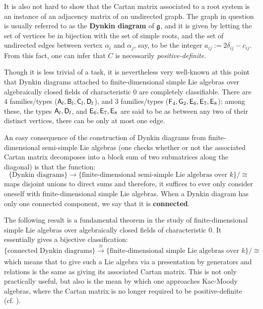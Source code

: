         \begin{remark}
            It is also not hard to show that the Cartan matrix associated to a root system is an instance of an adjacency matrix of an undirected graph. The graph in question is usually referred to as the \textbf{Dynkin diagram} of $\mathfrak{g}$, and it is given by letting the set of vertices be in bijection with the set of simple roots, and the set of undirected edges between vertex $\alpha_i$ and $\alpha_j$, say, to be the integer $a_{ij} := 2 \delta_{ij} - c_{ij}$. From this fact, one can infer that $C$ is necessarily \textit{positive-definite}.

            Though it is less trivial of a task, it is nevertheless very well-known at this point that Dynkin diagrams attached to finite-dimensional simple Lie algebras over algebraically closed fields of characteristic $0$ are completely classifiable. There are $4$  families/types ($\mathsf{A}_l, \mathsf{B}_l, \mathsf{C}_l, \mathsf{D}_l$), and $3$  families/types ($\mathsf{F}_4, \mathsf{G}_2, \mathsf{E}_6, \mathsf{E}_7, \mathsf{E}_8$); among these, the types $\mathsf{A}_l, \mathsf{D}_l$, and $\mathsf{E}_6, \mathsf{E}_7, \mathsf{E}_8$ are said to be  as between any two of their distinct vertices, there can be only at most one edge.
            
            An easy consequence of the construction of Dynkin diagrams from finite-dimensional semi-simple Lie algebras (one checks whether or not the associated Cartan matrix decomposes into a block sum of two submatrices along the diagonal) is that the function:
                $$\{ \text{Dynkin diagrams} \} \to \{ \text{finite-dimensional semi-simple Lie algebras over $k$} \}/\cong$$
            maps disjoint unions to direct sums and therefore, it suffices to ever only consider oneself with finite-dimensional simple Lie algebras. When a Dynkin diagram has only one connected component, we say that it is \textbf{connected}.
        \end{remark}
        The following result is a fundamental theorem in the study of finite-dimensional simple Lie algebras over algebraically closed fields of characteristic $0$. It essentially gives a bijective classification:
            $$\{ \text{connected Dynkin diagrams} \} \xrightarrow[]{\cong} \{ \text{finite-dimensional simple Lie algebras over $k$} \}/\cong$$
        which means that to give such a Lie algebra via a presentation by generators and relations is the same as giving its associated Cartan matrix. This is not only practically useful, but also is the mean by which one approaches Kac-Moody algebras, where the Cartan matrix is no longer required to be positive-definite (cf. \cite[Chapters 1-5]{kac_infinite_dimensional_lie_algebras}). 
